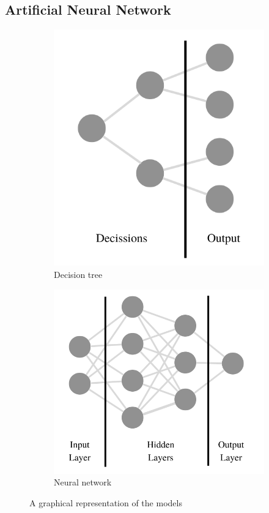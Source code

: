 \subsection{Artificial Neural Network}
\label{subsec:ann}

\begin{figure}
    \begin{subfigure}{.5\textwidth}
        \centering
        \includegraphics[width=.7\linewidth]{pics/Decission Tree.png}
        \caption{Decision tree}
        \label{fig:decission_graphic}
    \end{subfigure}%
    \begin{subfigure}{.5\textwidth}
        \centering
        \includegraphics[width=.9\linewidth]{pics/Neural Network.png}
        \caption{Neural network}
        \label{fig:nn_graphic_representation}
    \end{subfigure}
    \centering
    \caption{A graphical representation of the models}
    \label{fig:graphical_representation}
\end{figure}

